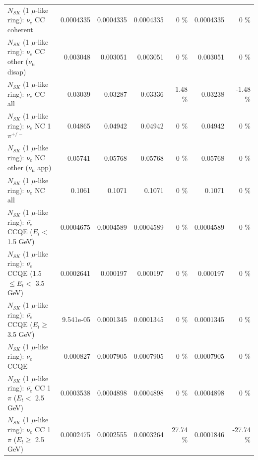 \begin{table}
\begin{tabular}{| l | r | r | r  r | r  r |}
                               $N_{SK}$ (1 $\mu$-like ring): $\nu_e$ CC coherent &       0.0004335 &       0.0004335 &       0.0004335 &        0 \%  &       0.0004335 &        0 \%  \\ 
                $N_{SK}$ (1 $\mu$-like ring): $\nu_e$ CC other ($\nu_\mu$ disap) &        0.003048 &        0.003051 &        0.003051 &        0 \%  &        0.003051 &        0 \%  \\ 
                                  $N_{SK}$ (1 $\mu$-like ring): $\nu_{e}$ CC all &         0.03039 &         0.03287 &         0.03336 &     1.48 \%  &         0.03238 &    -1.48 \%  \\ 
\hline
                           $N_{SK}$ (1 $\mu$-like ring): $\nu_e$ NC 1$\pi^{+/-}$ &         0.04865 &         0.04942 &         0.04942 &        0 \%  &         0.04942 &        0 \%  \\ 
                  $N_{SK}$ (1 $\mu$-like ring): $\nu_e$ NC other ($\nu_\mu$ app) &         0.05741 &         0.05768 &         0.05768 &        0 \%  &         0.05768 &        0 \%  \\ 
                                  $N_{SK}$ (1 $\mu$-like ring): $\nu_{e}$ NC all &          0.1061 &          0.1071 &          0.1071 &        0 \%  &          0.1071 &        0 \%  \\ 
\hline
\hline
\hline
            $N_{SK}$ (1 $\mu$-like ring): $\bar{\nu_e}$ CCQE ($E_{t} <$ 1.5 GeV) &       0.0004675 &       0.0004589 &       0.0004589 &        0 \%  &       0.0004589 &        0 \%  \\ 
   $N_{SK}$ (1 $\mu$-like ring): $\bar{\nu_e}$ CCQE (1.5 $\leq E_{t} <$ 3.5 GeV) &       0.0002641 &        0.000197 &        0.000197 &        0 \%  &        0.000197 &        0 \%  \\ 
         $N_{SK}$ (1 $\mu$-like ring): $\bar{\nu_e}$ CCQE ($E_{t} \geq$ 3.5 GeV) &       9.541e-05 &       0.0001345 &       0.0001345 &        0 \%  &       0.0001345 &        0 \%  \\ 
\hline
                                $N_{SK}$ (1 $\mu$-like ring): $\bar{\nu_e}$ CCQE &        0.000827 &       0.0007905 &       0.0007905 &        0 \%  &       0.0007905 &        0 \%  \\ 
\hline
       $N_{SK}$ (1 $\mu$-like ring): $\bar{\nu_e}$ CC 1$\pi$ ($E_{t} <$ 2.5 GeV) &       0.0003538 &       0.0004898 &       0.0004898 &        0 \%  &       0.0004898 &        0 \%  \\ 
    $N_{SK}$ (1 $\mu$-like ring): $\bar{\nu_e}$ CC 1$\pi$ ($E_{t} \geq$ 2.5 GeV) &       0.0002475 &       0.0002555 &       0.0003264 &    27.74 \%  &       0.0001846 &   -27.74 \%  \\ 

\end{tabular}
\end{table}
